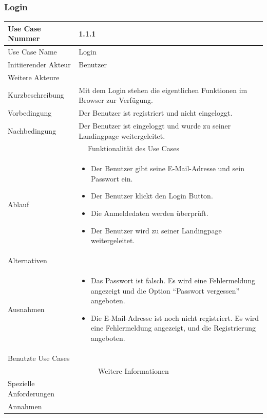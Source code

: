\documentclass[10pt,a4paper]{article}
\begin{document}
\subsubsection{Login}
	\begin{tabularx}{\textwidth}{|l|X|}
	\hline Use Case Nummer & 1.1.1 \\ 
	\hline Use Case Name & Login \\ 
	\hline Initiierender Akteur & Benutzer \\
	\hline Weitere Akteure & \\
	\hline Kurzbeschreibung & Mit dem Login stehen die eigentlichen Funktionen im Browser zur Verf\"ugung. \\
	\hline Vorbedingung & Der Benutzer ist registriert und nicht eingeloggt. \\
	\hline Nachbedingung & Der Benutzer ist eingeloggt und wurde zu seiner Landingpage weitergeleitet. \\
	\hline \multicolumn{2}{|c|}{Funktionalität des Use Cases}\\
	\hline Ablauf & \begin{itemize}
		\item Der Benutzer gibt seine E-Mail-Adresse und sein Passwort ein.
		\item Der Benutzer klickt den Login Button.
                \item Die Anmeldedaten werden überprüft.
                \item Der Benutzer wird zu seiner Landingpage weitergeleitet.
	\end{itemize} \\
	\hline Alternativen &  \\
	\hline Ausnahmen & \begin{itemize}
		\item Das Passwort ist falsch. Es wird eine Fehlermeldung angezeigt und die Option ``Passwort vergessen'' angeboten.
		\item Die E-Mail-Adresse ist noch nicht registriert. Es wird eine Fehlermeldung angezeigt, und die Registrierung angeboten.
	\end{itemize} \\
	\hline Benutzte Use Cases &  \\
	\hline \multicolumn{2}{|c|}{Weitere Informationen} \\
	\hline Spezielle Anforderungen &  \\
	\hline Annahmen &  \\
	\hline
	\end{tabularx}
			 
\end{document}
